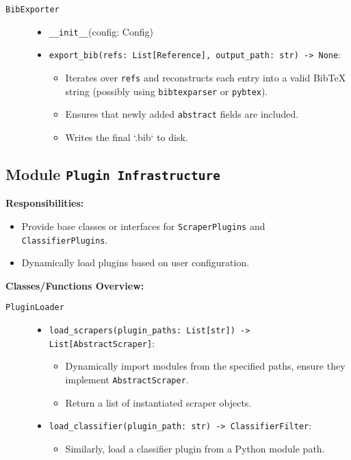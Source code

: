 \documentclass[12pt]{article}
\begin{document}
\begin{description}
  \item[\texttt{BibExporter}]
  \begin{itemize}
    \item \texttt{\_\_init\_\_}(config: Config)
    \item \texttt{export\_bib(refs: List[Reference], output\_path: str) -> None}:
      \begin{itemize}
        \item Iterates over \texttt{refs} and reconstructs each entry into a valid BibTeX string (possibly using \texttt{bibtexparser} or \texttt{pybtex}).
        \item Ensures that newly added \texttt{abstract} fields are included.
        \item Writes the final `.bib` to disk.
      \end{itemize}
  \end{itemize}
\end{description}

\subsection{Module \texttt{Plugin Infrastructure}}
\textbf{Responsibilities:}
\begin{itemize}
  \item Provide base classes or interfaces for \texttt{ScraperPlugins} and \texttt{ClassifierPlugins}.
  \item Dynamically load plugins based on user configuration.
\end{itemize}

\textbf{Classes/Functions Overview:}

\begin{description}
  \item[\texttt{PluginLoader}]
  \begin{itemize}
    \item \texttt{load\_scrapers(plugin\_paths: List[str]) -> List[AbstractScraper]}:
    \begin{itemize}
      \item Dynamically import modules from the specified paths, ensure they implement \texttt{AbstractScraper}.
      \item Return a list of instantiated scraper objects.
    \end{itemize}
    \item \texttt{load\_classifier(plugin\_path: str) -> ClassifierFilter}:
    \begin{itemize}
      \item Similarly, load a classifier plugin from a Python module path.
    \end{itemize}
  \end{itemize}
\end{description}
\end{document}
